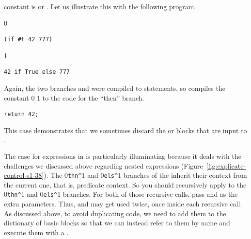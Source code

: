 \documentclass[7x10,nocrop]{TimesAPriori_MIT}%
\def\racketEd{0}
\def\pythonEd{1}
\def\edition{1}
\newcommand{\racket}[1]{{\if\edition\racketEd{#1}\fi}}
\newcommand{\python}[1]{{\if\edition\pythonEd #1\fi}}
\begin{document}
constant is \TRUE{} or \FALSE{}. Let us illustrate this with the
following program.
{\if\edition\racketEd
\begin{center}
\begin{minipage}{\textwidth}
\begin{lstlisting}
(if #t 42 777)
\end{lstlisting}
\end{minipage}
\end{center}
\fi}
{\if\edition\pythonEd
\begin{center}
\begin{minipage}{\textwidth}
\begin{lstlisting}
42 if True else 777
\end{lstlisting}
\end{minipage}
\end{center}
\fi}
%
Again, the two branches  and  were compiled to
 statements, so  compiles the
constant
\racket{}
\python{}
to the code for the ``then'' branch.
\begin{center}
\begin{minipage}{\textwidth}
\begin{lstlisting}
return 42;
\end{lstlisting}
\end{minipage}
\end{center}
%
This case demonstrates that we sometimes discard the  or
 blocks that are input to .

The case for  expressions in  is
particularly illuminating because it deals with the challenges we
discussed above regarding nested  expressions
(Figure~\ref{fig:explicate-control-s1-38}).  The
\racket{\lstinline{thn^}}\python{} and
\racket{\lstinline{els^}}\python{} branches of the
 inherit their context from the current one, that is,
predicate context. So you should recursively apply
 to the
\racket{\lstinline{thn^}}\python{} and
\racket{\lstinline{els^}}\python{} branches. For both of
those recursive calls, pass  and  as the extra
parameters. Thus,  and  may get used twice, once
inside each recursive call. As discussed above, to avoid duplicating
code, we need to add them to the dictionary of basic blocks so that we
can instead refer to them by name and execute them with a .
\end{document}
